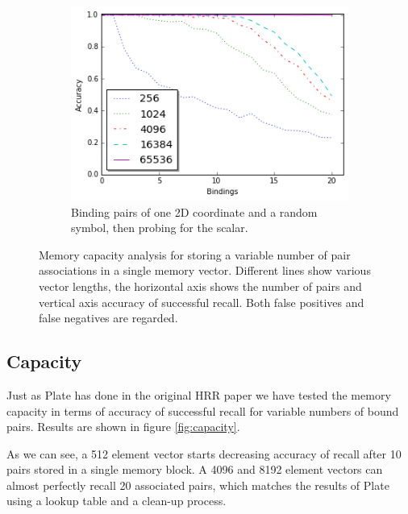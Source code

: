 \documentclass[conference]{IEEEtran}
\begin{document}
\begin{figure}[th!]
\begin{subfigure}{0.45\columnwidth}
				\includegraphics[width=1\columnwidth]{img/capacity_coordinate.png}
				\caption{Binding pairs of one 2D coordinate and a random symbol, then probing for the scalar.}
				\label{fig:capacity_coordinate}
			\end{subfigure}	
			\caption{Memory capacity analysis for storing a variable number of pair associations in a single memory vector. Different lines show various vector lengths, the horizontal axis shows the number of pairs and vertical axis accuracy of successful recall. Both false positives and false negatives are regarded.}
		\end{figure}	
	
	
	\subsection{Capacity}
	
	Just as Plate has done in the original HRR paper \cite{Plate:1995:HolographicReducedRepresentations} we have tested the memory capacity in terms of accuracy of successful recall for variable numbers of bound pairs. Results are shown in figure \ref{fig:capacity}.
	
	As we can see, a 512 element vector starts decreasing accuracy of recall after 10 pairs stored in a single memory block. A 4096 and 8192 element vectors can almost perfectly recall 20 associated pairs, which matches the results of Plate using a lookup table and a clean-up process. 
	
\end{document}
